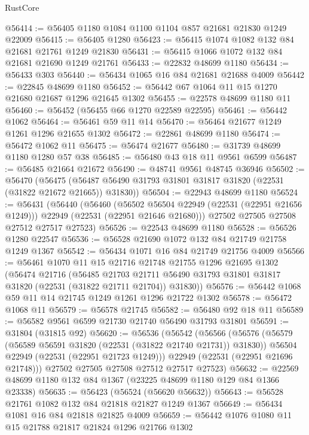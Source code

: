 \begin{lexlean}{RustCore}
\begin{coremodule}
@56414 := @56405 @1180 @1084 @1100 @1104 @857 @21681 @21830 @1249 @22009
@56415 := @56405 @1280
@56423 := @56415 @1074 @1082 @132 @84 @21681 @21761 @1249 @21830
@56431 := @56415 @1066 @1072 @132 @84 @21681 @21690 @1249 @21761
@56433 := @22832 @48699 @1180
@56434 := @56433 @303
@56440 := @56434 @1065 @16 @84 @21681 @21688 @4009
@56442 := @22845 @48699 @1180
@56452 := @56442 @67 @1064 @11 @15 @1270 @21680 @21687 @1296 @21645 @1302
@56455 := @22578 @48699 @1180 @11
@56460 := @56452 (@56455 @66 @1270 @22589 @22595)
@56461 := @56442 @1062
@56464 := @56461 @59 @11 @14
@56470 := @56464 @21677 @1249 @1261 @1296 @21655 @1302
@56472 := @22861 @48699 @1180
@56474 := @56472 @1062 @11
@56475 := @56474 @21677
@56480 := @31739 @48699 @1180 @1280 @57 @38
@56485 := @56480 @43 @18 @11 @9561 @6599
@56487 := @56485 @21664 @21672
@56490 := @48741 @9561 @48745 @36946
@56502 := @56470
    (@56475 (@56487 @56490 @31793 @31801 @31817 @31820 (@22531 (@31822 @21672 @21665)) @31830))
@56504 := @22943 @48699 @1180
@56524 := @56431
    (@56440
      (@56460
        (@56502 @56504 @22949 (@22531 (@22951 @21656 @1249)))
        @22949
        (@22531 (@22951 @21646 @21680)))
      @27502
      @27505
      @27508
      @27512
      @27517
      @27523)
@56526 := @22543 @48699 @1180
@56528 := @56526 @1280 @22547
@56536 := @56528 @21690 @1072 @132 @84 @21749 @21758 @1249 @1367
@56542 := @56434 @1071 @16 @84 @21749 @21756 @4009
@56566 := @56461
    @1070
    @11
    @15
    @21716
    @21748
    @21755
    @1296
    @21695
    @1302
    (@56474
      @21716
      (@56485
        @21703
        @21711
        @56490
        @31793
        @31801
        @31817
        @31820
        (@22531 (@31822 @21711 @21704))
        @31830))
@56576 := @56442 @1068 @59 @11 @14 @21745 @1249 @1261 @1296 @21722 @1302
@56578 := @56472 @1068 @11
@56579 := @56578 @21745
@56582 := @56480 @92 @18 @11
@56589 := @56582 @9561 @6599 @21730 @21740 @56490 @31793 @31801
@56591 := @31804 (@31815 @92)
@56620 := @56536
    (@56542
      (@56566
        (@56576
          (@56579 (@56589 @56591 @31820 (@22531 (@31822 @21740 @21731)) @31830))
          @56504
          @22949
          (@22531 (@22951 @21723 @1249)))
        @22949
        (@22531 (@22951 @21696 @21748)))
      @27502
      @27505
      @27508
      @27512
      @27517
      @27523)
@56632 := @22569 @48699 @1180 @132 @84 @1367 (@23225 @48699 @1180 @129 @84 @1366 @23338)
@56635 := @56423 (@56524 (@56620 @56632))
@56643 := @56528 @21761 @1082 @132 @84 @21818 @21827 @1249 @1367
@56649 := @56434 @1081 @16 @84 @21818 @21825 @4009
@56659 := @56442 @1076 @1080 @11 @15 @21788 @21817 @21824 @1296 @21766 @1302

\end{coremodule}
\end{lexlean}
